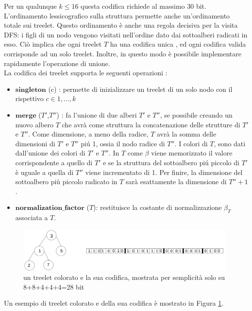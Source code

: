 Per un qualunque $ k \le 16 $ questa codifica richiede al massimo 30 bit.
L'ordinamento lessicografico sulla struttura permette anche un'ordinamento totale sui treelet. Questo ordinamento \`e anche una regola decisiva per la visita DFS: i figli di un nodo vengono visitati nell'ordine dato dai sottoalberi radicati in esso.
Ci\`o implica che ogni treelet $ T $ ha una codifica unica , ed ogni codifica valida corrisponde ad un solo treelet. Inoltre, in questo modo \`e possibile implementare rapidamente l'operazione di unione.\\

La codifica dei treelet supporta le seguenti operazioni :
\begin{itemize}
	\item $ \textbf{singleton} $ (c) : permette di inizializzare un treelet di un solo nodo con il rispettivo $ c \in {1, \dots, k} $
	\item $ \textbf{merge} $ ($ T' $,$ T'' $) : fa l'unione di due alberi $ T' $ e $ T'' $, se possibile creando un nuovo albero $ T $ che avr\`a come struttura la concatenazione delle strutture di $ T' $ e $ T'' $.
	Come dimensione, a meno della radice, $ T $ avr\`a la somma delle dimensioni di $ T' $ e $ T'' $ pi\'u 1, ossia il nodo radice di $ T'' $.
	I colori di $ T $, sono dati dall'unione dei colori di $ T' $ e $ T'' $.
	In $ T $ come $ \beta $ viene memorizzato il valore corrispondente a quello di $ T' $ e se la struttura del sottoalbero pi\'u piccolo di $ T' $ \`e uguale a quella di $ T'' $ viene incrementato di 1. Per finire, la dimensione del sottoalbero pi\`u piccolo radicato in $ T $ sar\`a esattamente la dimensione di $ T''+1  $ .
	\item $\textbf{normalization\_factor}$ ($ T $): restituisce la costante di normalizzazione $ \beta_T $ associata a $ T $.
	    
\end{itemize}
\begin{figure}[htbp]
	\centering
	\includegraphics[width=11cm]{capitolo2/grafo4}
	\caption{un treelet colorato e la sua codifica, mostrata per semplicit\`a solo su 8+8+4+4+4=28 bit}
	\label{figura1}
\end{figure}
Un esempio di treelet colorato e della sua codifica \`e mostrato in Figura \ref{figura1}.\mbox{}\\\\
